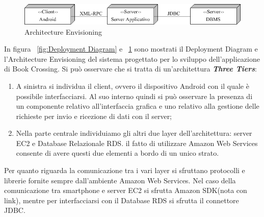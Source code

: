 \begin{figure}[h]
	\includegraphics[width=\textwidth]{Immagini/Architecture_Envisoring}
	\caption{Architecture Envisioning}
	\label{fig:ArchitectureEnvisoring}
\end{figure}
\noindent
In figura ~\ref{fig:Deployment Diagram} e ~\ref{fig:ArchitectureEnvisoring} sono mostrati il Deployment Diagram e l'Architecture Envisioning del sistema progettato per lo sviluppo dell’applicazione di Book Crossing. Si può osservare che si tratta di un’architettura \textbf{\textit{Three Tiers}}:
\begin{enumerate}
	\item A sinistra si individua il client, ovvero il dispositivo Android con il quale è possibile interfacciarsi. Al suo interno quindi si può osservare la presenza di un componente relativo all’interfaccia grafica e uno relativo alla gestione delle richieste per invio e ricezione di dati con il server;
	\item Nella parte centrale individuiamo gli altri due layer dell’architettura: server EC2 e Database Relazionale RDS. il fatto di utilizzare Amazon Web Services consente di avere questi due elementi a bordo di un unico strato.
\end{enumerate}
\noindent
Per quanto riguarda la comunicazione tra i vari layer si sfruttano protocolli e librerie fornite sempre dall'ambiente Amazon Web Services. Nel caso della comunicazione tra smartphone e server EC2 si sfrutta Amazon SDK(nota con link), mentre per interfacciarsi con il Database RDS si sfrutta il connettore JDBC.